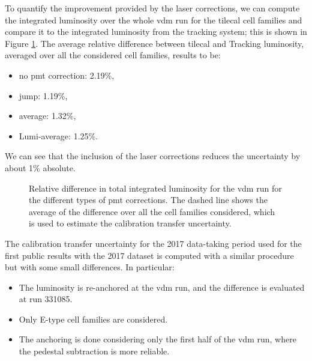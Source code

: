To quantify the improvement provided by the laser corrections, we can compute the integrated luminosity over the whole 
\gls{vdm} run for the \gls{tilecal} cell families and compare it to the integrated luminosity from the tracking system; 
this is shown in Figure \ref{fig:apppmt:totallumi}. 
The average relative difference between \gls{tilecal} and Tracking luminosity, averaged over all 
the considered cell families, results to be:
\begin{itemize}
\item no \gls{pmt} correction: 2.19\%,
\item jump: 1.19\%,
\item average: 1.32\%,
\item Lumi-average: 1.25\%.
\end{itemize}
\noindent We can see that the inclusion of the laser corrections reduces the uncertainty by about 1\% absolute.

\begin{figure}[htbp]
\centering
{}
\caption{Relative difference in total integrated luminosity for the \gls{vdm} run for the different types of 
\gls{pmt} corrections. The dashed line shows the average of the difference over all the cell families considered, which 
is used to estimate the calibration transfer uncertainty.}
\label{fig:apppmt:totallumi}
\end{figure}

The calibration transfer uncertainty for the 2017 data-taking period used for the first public results 
with the 2017 dataset 
is computed with a similar procedure but with some small differences.
In particular:
\begin{itemize}
\item The luminosity is re-anchored at the \gls{vdm} run, and the difference is evaluated at run 331085. 
\item Only E-type cell families are considered.
\item The anchoring is done considering only the first half of the \gls{vdm} run, where the 
pedestal subtraction is more reliable.
\end{itemize}

